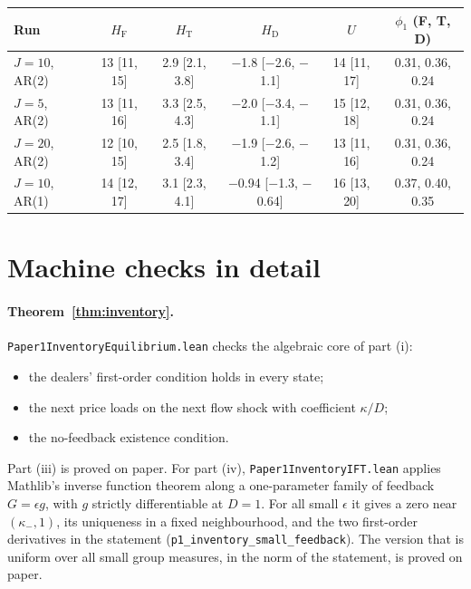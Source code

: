 \documentclass[12pt]{article}
\theoremstyle{definition}
\theoremstyle{remark}
\begin{document}
\begin{center}\footnotesize\setlength{\tabcolsep}{4pt}
\begin{tabular}{lccccc}\toprule
Run & $H_{\mathrm F}$ & $H_{\mathrm T}$ & $H_{\mathrm D}$ & $U$ & $\phi_1$ (F, T, D)\\\midrule
$J=10$, AR(2) & 13 [11, 15] & 2.9 [2.1, 3.8] & $-$1.8 [$-$2.6, $-$1.1] & 14 [11, 17] & 0.31, 0.36, 0.24\\
$J=5$, AR(2) & 13 [11, 16] & 3.3 [2.5, 4.3] & $-$2.0 [$-$3.4, $-$1.1] & 15 [12, 18] & 0.31, 0.36, 0.24\\
$J=20$, AR(2) & 12 [10, 15] & 2.5 [1.8, 3.4] & $-$1.9 [$-$2.6, $-$1.2] & 13 [11, 16] & 0.31, 0.36, 0.24\\
$J=10$, AR(1) & 14 [12, 17] & 3.1 [2.3, 4.1] & $-$0.94 [$-$1.3, $-$0.64] & 16 [13, 20] & 0.37, 0.40, 0.35\\
\bottomrule\end{tabular}
\end{center}


\section{Machine checks in detail}\label{app:mc}

\paragraph{Theorem~\ref{thm:inventory}.}
\nolinkurl{Paper1InventoryEquilibrium.lean} checks the algebraic core of part (i):
\begin{itemize}[itemsep=1pt,topsep=2pt]
\item the dealers' first-order condition holds in every state;
\item the next price loads on the next flow shock with coefficient $\kappa/D$;
\item the no-feedback existence condition.
\end{itemize}
Part (iii) is proved on paper. For part (iv), \nolinkurl{Paper1InventoryIFT.lean} applies Mathlib's inverse function theorem along a one-parameter family of feedback $G=\epsilon g$, with $g$ strictly differentiable at $D=1$. For all small $\epsilon$ it gives a zero near $(\kappa_-,1)$, its uniqueness in a fixed neighbourhood, and the two first-order derivatives in the statement (\nolinkurl{p1_inventory_small_feedback}). The version that is uniform over all small group measures, in the norm of the statement, is proved on paper.
\end{document}
